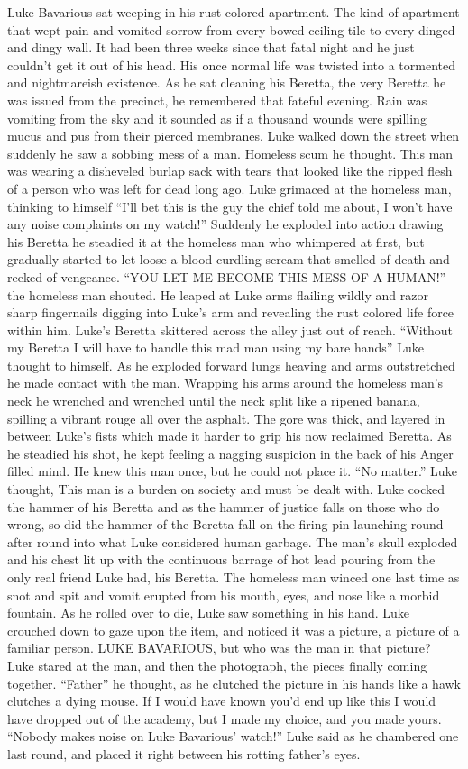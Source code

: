 Luke Bavarious sat weeping in his rust colored apartment. The kind
of apartment that wept pain and vomited sorrow from every bowed
ceiling tile to every dinged and dingy wall. It had been three
weeks since that fatal night and he just couldn't get it out
of his head. His once normal life was twisted into a tormented and
nightmareish existence. As he sat cleaning his Beretta, the very
Beretta he was issued from the precinct, he remembered that fateful
evening. Rain was vomiting from the sky and it sounded as if a
thousand wounds were spilling mucus and pus from their pierced
membranes. Luke walked down the street when suddenly he saw a
sobbing mess of a man. Homeless scum he thought. This man was
wearing a disheveled burlap sack with tears that looked like the
ripped flesh of a person who was left for dead long ago. Luke
grimaced at the homeless man, thinking to himself ``I'll
bet this is the guy the chief told me about, I won't have any
noise complaints on my watch!'' Suddenly he exploded into
action drawing his Beretta he steadied it at the homeless man who
whimpered at first, but gradually started to let loose a blood
curdling scream that smelled of death and reeked of vengeance.
``YOU LET ME BECOME THIS MESS OF A HUMAN!'' the homeless
man shouted. He leaped at Luke arms flailing wildly and razor sharp
fingernails digging into Luke's arm and revealing the rust
colored life force within him. Luke's Beretta skittered
across the alley just out of reach. ``Without my Beretta I
will have to handle this mad man using my bare hands'' Luke
thought to himself. As he exploded forward lungs heaving and arms
outstretched he made contact with the man. Wrapping his arms around
the homeless man's neck he wrenched and wrenched until the
neck split like a ripened banana, spilling a vibrant rouge all over
the asphalt. The gore was thick, and layered in between
Luke's fists which made it harder to grip his now reclaimed
Beretta. As he steadied his shot, he kept feeling a nagging
suspicion in the back of his Anger filled mind. He knew this man
once, but he could not place it. ``No matter.'' Luke
thought, This man is a burden on society and must be dealt with.
Luke cocked the hammer of his Beretta and as the hammer of justice
falls on those who do wrong, so did the hammer of the Beretta fall
on the firing pin launching round after round into what Luke
considered human garbage. The man's skull exploded and his
chest lit up with the continuous barrage of hot lead pouring from
the only real friend Luke had, his Beretta. The homeless man winced
one last time as snot and spit and vomit erupted from his mouth,
eyes, and nose like a morbid fountain. As he rolled over to die,
Luke saw something in his hand. Luke crouched down to gaze upon the
item, and noticed it was a picture, a picture of a familiar person.
LUKE BAVARIOUS, but who was the man in that picture? Luke stared at
the man, and then the photograph, the pieces finally coming
together. ``Father'' he thought, as he clutched the
picture in his hands like a hawk clutches a dying mouse. If I would
have known you'd end up like this I would have dropped out of
the academy, but I made my choice, and you made yours.
``Nobody makes noise on Luke Bavarious' watch!''
Luke said as he chambered one last round, and placed it right
between his rotting father's eyes.

